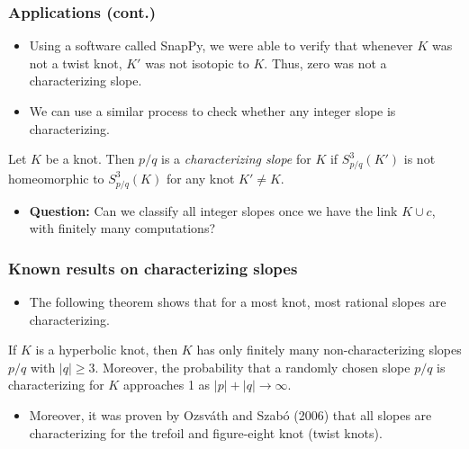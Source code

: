 \documentclass{beamer}
\theoremstyle{ex}
\theoremstyle{rem}
\begin{document}
	\begin{frame}
		\frametitle{Applications (cont.)}
		
	\begin{itemize}
		\item Using a software called SnapPy, we were able to verify that whenever $K$ was not a twist knot, $K'$ was not isotopic to $K$. Thus, zero was not a characterizing slope.
		\item We can use a similar process to check whether any integer slope is characterizing.
	\end{itemize}
\begin{definition}
	Let $K$ be a knot. Then $p/q$ is a \textit{characterizing slope} for $K$ if $S^3_{p/q}(K')$ is not homeomorphic to $S^3_{p/q}(K)$ for any knot $K'\ne K$.
\end{definition}
	
	\begin{itemize}
		\item \textbf{Question:} Can we classify all integer slopes once we have the link $K\cup c$, with finitely many computations?
	\end{itemize}
\end{frame}

	\begin{frame}
		\frametitle{Known results on characterizing slopes}
		\begin{itemize}
		
		\item The following theorem shows that for a most knot, most rational slopes are characterizing.
		\end{itemize}
		\pause
		\begin{theorem}[McCoy, 2018]
			If $K$ is a hyperbolic knot, then $K$ has only finitely many non-characterizing slopes $p/q$ with $|q|\geq 3$. Moreover, the probability that a randomly chosen slope $p/q$ is characterizing for $K$ approaches 1 as $|p|+|q|\to\infty$.
		\end{theorem}
	
	\begin{itemize}
		\item Moreover, it was proven by Ozsv\'{a}th and Szab\'{o} (2006) that all slopes are characterizing for the trefoil and figure-eight knot (twist knots).
	\end{itemize}
	\end{frame}
	
\end{document}

